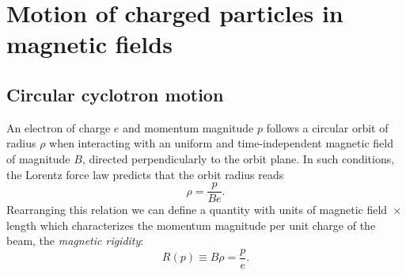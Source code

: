 \section{Motion of charged particles in magnetic fields}
\subsection{Circular cyclotron motion}
An electron of charge $e$ and momentum magnitude $p$ follows a circular orbit of radius $\rho$ when interacting with an uniform and time-independent magnetic field of magnitude $B$, directed perpendicularly to the orbit plane. In such conditions, the Lorentz force law predicts that the orbit radius reads
\begin{equation}
    \rho = \frac{p}{Be}.
    \label{eq:Lorentz}
\end{equation}
Rearranging this relation we can define a quantity with units of magnetic field~$\times$ length which characterizes the momentum magnitude per unit charge of the beam, the \textit{magnetic rigidity}:
\begin{equation}
    R(p) \equiv B\rho = \frac{p}{e}.
    \label{eq:rigidity}
\end{equation}
